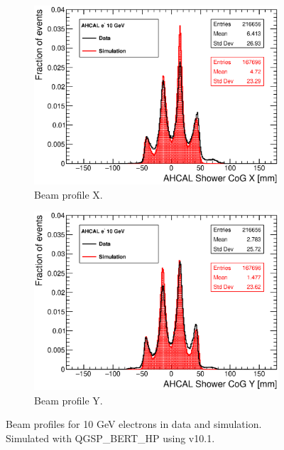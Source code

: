 \begin{figure}[htbp!]
	\centering
	\begin{subfigure}[t]{0.49\textwidth}
		\includegraphics[width=1.\linewidth]{../Thesis_Plots/EnergyCalib/Plots/Run24542_CoGX_AHCAL_10GeV_Comparison.eps}
		\caption{Beam profile X.} \label{fig:e10GeVX}
	\end{subfigure}
	\hfill
	\begin{subfigure}[t]{0.49\textwidth}
		\includegraphics[width=1.\linewidth]{../Thesis_Plots/EnergyCalib/Plots/Run24542_CoGY_AHCAL_10GeV_Comparison.eps}
		\caption{Beam profile Y.} \label{fig:e10GeVY}
	\end{subfigure}
	\caption{Beam profiles for 10 GeV electrons in data and simulation. Simulated with QGSP\_BERT\_HP using \geant v10.1.}
	\label{fig:BPe}
\end{figure}

